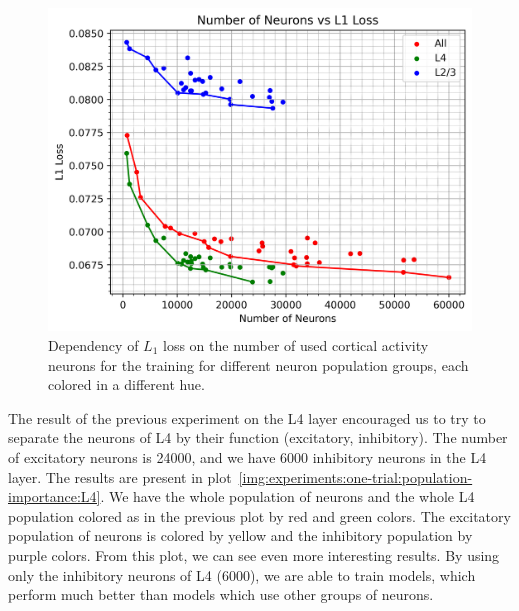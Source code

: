 \begin{figure}[H]\centering
\includegraphics[width=140mm]{img/one-trial/responses_size_groups_one_trial.png}
\caption{Dependency of $L_1$ loss on the number of used cortical activity neurons for the training for different neuron population groups, each colored in a different hue.}
\label{img:experiments:one-trial:population-importance:all}
\end{figure}

The result of the previous experiment on the L4 layer encouraged us to try to separate the neurons of L4 by their function (excitatory, inhibitory). The number of excitatory neurons is 24000, and we have 6000 inhibitory neurons in the L4 layer. The results are present in plot~\ref{img:experiments:one-trial:population-importance:L4}. We have the whole population of neurons and the whole L4 population colored as in the previous plot by red and green colors. The excitatory population of neurons is colored by yellow and the inhibitory population by purple colors. From this plot, we can see even more interesting results. By using only the inhibitory neurons of L4 (6000), we are able to train models, which perform much better than models which use other groups of neurons.

